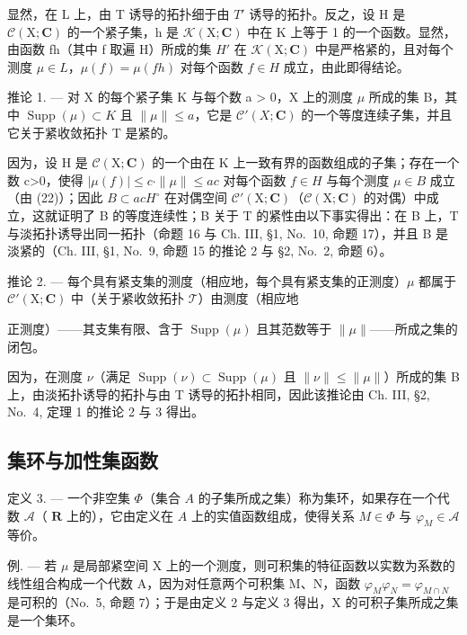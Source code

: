 显然，在 L 上，由 T 诱导的拓扑细于由 \(T'\) 诱导的拓扑。反之，设 H 是 \(\mathcal{C}(\mathrm{X};\mathbf{C})\) 的一个紧子集，h 是 \(\mathcal{K}(\mathrm{X};\mathbf{C})\) 中在 K 上等于 1 的一个函数。显然，由函数 fh（其中 f 取遍 H）所成的集 \(H'\) 在 \(\mathcal{K}(\mathrm{X};\mathbf{C})\) 中是严格紧的，且对每个测度 \(\mu\in L\)，\(\mu(f)=\mu(fh)\) 对每个函数 \(f\in H\) 成立，由此即得结论。

推论 1. --- 对 X 的每个紧子集 K 与每个数 a \textgreater{} 0，X 上的测度 \(\mu\) 所成的集 B，其中 \(\operatorname{Supp}(\mu) \subset K\) 且 \(\|\mu\| \leqslant a\)，它是 \(\mathcal{C}'(X; \mathbf{C})\) 的一个等度连续子集，并且它关于紧收敛拓扑 T 是紧的。

因为，设 H 是 \(\mathcal{C}(\mathrm{X};\mathbf{C})\) 的一个由在 K 上一致有界的函数组成的子集；存在一个数 c\textgreater0，使得 \(|\mu(f)|\leqslant c\cdot\|\mu\|\leqslant ac\) 对每个函数 \(f\in H\) 与每个测度 \(\mu\in B\) 成立（由 (22)）；因此 \(B\subset acH^{\circ}\) 在对偶空间 \(\mathcal{C}'(\mathrm{X};\mathbf{C})\)（\(\mathcal{C}(\mathrm{X};\mathbf{C})\) 的对偶）中成立，这就证明了 B 的等度连续性；B 关于 T 的紧性由以下事实得出：在 B 上，T 与淡拓扑诱导出同一拓扑（命题 16 与 Ch. III, §1, No.~10, 命题 17），并且 B 是淡紧的（Ch. III, §1, No.~9, 命题 15 的推论 2 与 §2, No.~2, 命题 6）。

推论 2. --- 每个具有紧支集的测度（相应地，每个具有紧支集的正测度）\(\mu\) 都属于 \(\mathcal{C}'(\mathrm{X};\mathbf{C})\) 中（关于紧收敛拓扑 \(\mathcal{T}\)）由测度（相应地

正测度）——其支集有限、含于 \(\operatorname{Supp}(\mu)\) 且其范数等于 \(\| \mu \|\)——所成之集的闭包。

因为，在测度 \(\nu\)（满足 \(\operatorname{Supp}(\nu) \subset \operatorname{Supp}(\mu)\) 且 \(\|\nu\| \leqslant \|\mu\|\)）所成的集 B 上，由淡拓扑诱导的拓扑与由 T 诱导的拓扑相同，因此该推论由 Ch. III, §2, No.~4, 定理 1 的推论 2 与 3 得出。

\subsection{集环与加性集函数}

定义 3. --- 一个非空集 \(\Phi\)（集合 \(A\) 的子集所成之集）称为集环，如果存在一个代数 \(\mathcal{A}\)（ \(\mathbf{R}\) 上的），它由定义在 \(A\) 上的实值函数组成，使得关系 \(M \in \Phi\) 与 \(\varphi_{M} \in \mathcal{A}\) 等价。

例. --- 若 \(\mu\) 是局部紧空间 X 上的一个测度，则可积集的特征函数以实数为系数的线性组合构成一个代数 A，因为对任意两个可积集 M、N，函数 \(\varphi_{M}\varphi_{N} = \varphi_{M\cap N}\) 是可积的（No.~5, 命题 7）；于是由定义 2 与定义 3 得出，X 的可积子集所成之集是一个集环。

